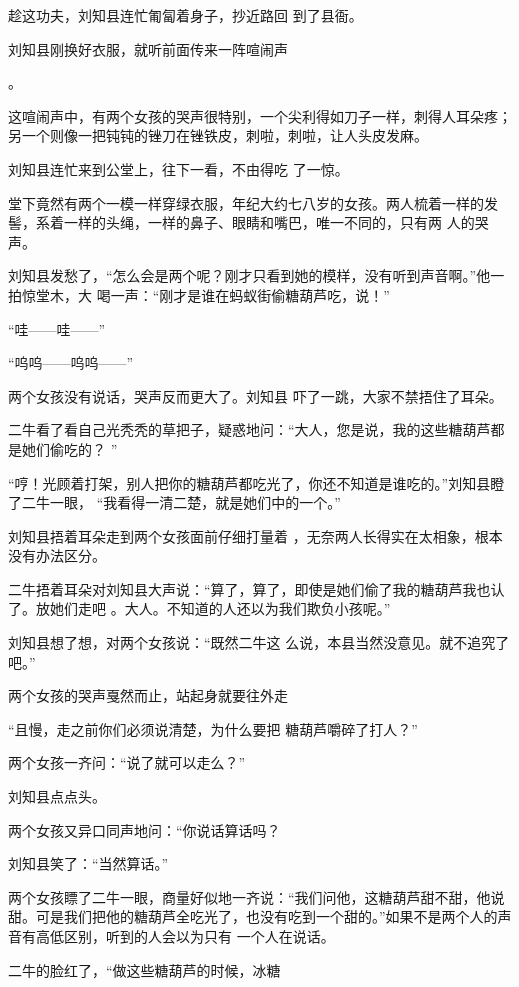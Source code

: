 \documentclass{article}
\begin{document}
趁这功夫，刘知县连忙匍匐着身子，抄近路回
到了县衙。 

刘知县刚换好衣服，就听前面传来一阵喧闹声

\newpage
。 

这喧闹声中，有两个女孩的哭声很特别，一个尖利得如刀子一样，刺得人耳朵疼；另一个则像一把钝钝的锉刀在锉铁皮，刺啦，刺啦，让人头皮发麻。

刘知县连忙来到公堂上，往下一看，不由得吃
了一惊。 

堂下竟然有两个一模一样穿绿衣服，年纪大约七八岁的女孩。两人梳着一样的发髻，系着一样的头绳，一样的鼻子、眼睛和嘴巴，唯一不同的，只有两
人的哭声。 

刘知县发愁了，“怎么会是两个呢？刚才只看到她的模样，没有听到声音啊。”他一拍惊堂木，大
喝一声：“刚才是谁在蚂蚁街偷糖葫芦吃，说！” 


“哇——哇——” 


“呜呜——呜呜——” 

\newpage

两个女孩没有说话，哭声反而更大了。刘知县
吓了一跳，大家不禁捂住了耳朵。 

二牛看了看自己光秃秃的草把子，疑惑地问：“大人，您是说，我的这些糖葫芦都是她们偷吃的？
” 

“哼！光顾着打架，别人把你的糖葫芦都吃光了，你还不知道是谁吃的。”刘知县瞪了二牛一眼，
“我看得一清二楚，就是她们中的一个。” 

刘知县捂着耳朵走到两个女孩面前仔细打量着
，无奈两人长得实在太相象，根本没有办法区分。 

二牛捂着耳朵对刘知县大声说：“算了，算了，即使是她们偷了我的糖葫芦我也认了。放她们走吧
。大人。不知道的人还以为我们欺负小孩呢。” 

刘知县想了想，对两个女孩说：“既然二牛这
么说，本县当然没意见。就不追究了吧。” 

\newpage

两个女孩的哭声戛然而止，站起身就要往外走

“且慢，走之前你们必须说清楚，为什么要把
糖葫芦嚼碎了打人？” 


两个女孩一齐问：“说了就可以走么？” 


刘知县点点头。 

两个女孩又异口同声地问：“你说话算话吗？


刘知县笑了：“当然算话。” 

两个女孩瞟了二牛一眼，商量好似地一齐说：“我们问他，这糖葫芦甜不甜，他说甜。可是我们把他的糖葫芦全吃光了，也没有吃到一个甜的。”如果不是两个人的声音有高低区别，听到的人会以为只有
一个人在说话。 

二牛的脸红了，“做这些糖葫芦的时候，冰糖
\end{document}
